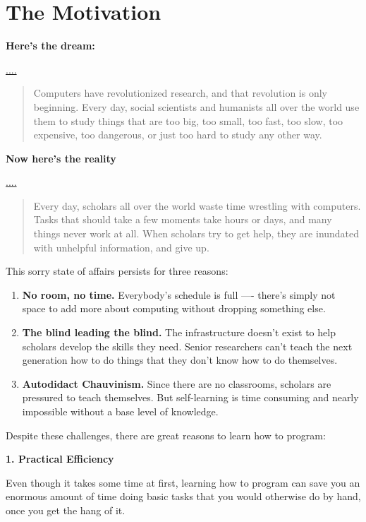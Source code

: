 \documentclass[]{book}
\begin{document}
\hypertarget{the-motivation}{%
\section{The Motivation}\label{the-motivation}}

\textbf{Here's the dream:}

\url{....}

\begin{quote}
Computers have revolutionized research, and that revolution is only
beginning. Every day, social scientists and humanists all over the world
use them to study things that are too big, too small, too fast, too slow,
too expensive, too dangerous, or just too hard to study any other way.
\end{quote}

\textbf{Now here's the reality}

\url{....}

\begin{quote}
Every day, scholars all over the world waste time wrestling with
computers. Tasks that should take a few moments take hours or days,
and many things never work at all. When scholars try to get help,
they are inundated with unhelpful information, and give up.
\end{quote}

This sorry state of affairs persists for three reasons:

\begin{enumerate}
\def\labelenumi{\arabic{enumi}.}
\item
  \textbf{No room, no time.}
  Everybody's schedule is full ---- there's simply not space to add more
  about computing without dropping something else.
\item
  \textbf{The blind leading the blind.}
  The infrastructure doesn't exist to help scholars develop the skills they need. Senior researchers can't teach the next generation how to do things
  that they don't know how to do themselves.
\item
  \textbf{Autodidact Chauvinism.}
  Since there are no classrooms, scholars are pressured to teach themselves. But self-learning is time consuming and nearly impossible without a base level of knowledge.
\end{enumerate}

Despite these challenges, there are great reasons to learn how to program:

\textbf{1. Practical Efficiency}

Even though it takes some time at first, learning how to program can save you an enormous amount of time doing basic tasks that you would otherwise do by hand, once you get the hang of it.
\end{document}
